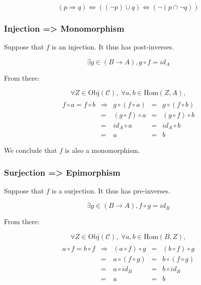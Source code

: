\documentclass[12pt, letterpaper, twoside]{report}
\begin{document}
$$
(p \Rightarrow q)
\Leftrightarrow ((\neg  p) \cup      q )
\Leftrightarrow ( \neg (p  \cap \neg q))
$$


\subsubsection*{Injection => Monomorphism}

Suppose that $f$ is an injection. It thus has post-inverses.

$$\exists g \in (B \to A), g \circ f = id_A$$

From there:

$$
\forall Z \in \text{Obj}(\mathcal{C}), \;
\forall a, b \in \text{Hom}(Z, A),
$$
$$
\begin{array}{ccccc} \\
f \circ a = f \circ b & \Rightarrow &  g \circ (f  \circ a) &=&  g \circ (f  \circ b) \\
                      & =           & (g \circ  f) \circ a  &=& (g \circ  f) \circ b  \\
                      & =           &         id_A \circ a  &=&         id_A \circ b  \\
                      & =           &                    a  &=&                    b
\end{array}
$$

We conclude that $f$ is also a monomorphism.


\subsubsection*{Surjection => Epimorphism}

Suppose that $f$ is a surjection. It thus has pre-inverses.

$$\exists g \in (B \to A), f \circ g = id_B$$

From there:

$$
\forall Z \in \text{Obj}(\mathcal{C}), \;
\forall a, b \in \text{Hom}(B, Z),
$$
$$
\begin{array}{ccccc} \\
a \circ f = b \circ f & \Rightarrow & (a \circ  f) \circ g  &=& (b \circ  f) \circ g  \\
                      & =           &  a \circ (f  \circ g) &=&  b \circ (f  \circ g) \\
                      & =           &  a \circ  id_B        &=&  b \circ  id_B        \\
                      & =           &  a                    &=&  b
\end{array}
$$
\end{document}
